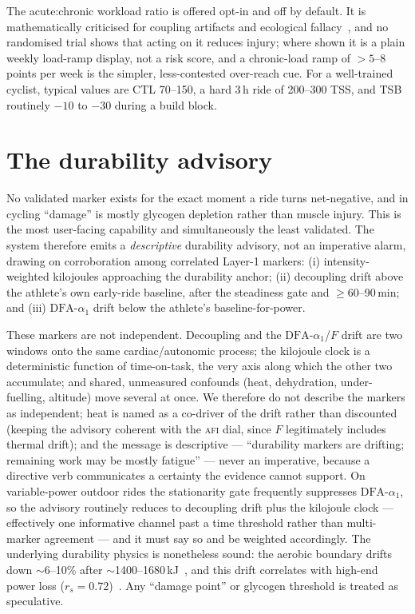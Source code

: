 \documentclass[11pt]{article}
\newcommand{\afi}{\textup{\textsc{afi}}}
\newcommand{\aone}{\ensuremath{\text{DFA-}\alpha_1}}
\newcommand{\Fstate}{\ensuremath{F}}
\begin{document}
The acute:chronic workload ratio is offered opt-in and off by default. It is mathematically criticised for coupling artifacts and ecological fallacy~\cite{lolli,impellizzeri}, and no randomised trial shows that acting on it reduces injury; where shown it is a plain weekly load-ramp display, not a risk score, and a chronic-load ramp of ${>}5$--8 points per week is the simpler, less-contested over-reach cue. For a well-trained cyclist, typical values are CTL 70--150, a hard 3\,h ride of 200--300 TSS, and TSB routinely $-10$ to $-30$ during a build block.

\section{The durability advisory}\label{sec:advisory}

No validated marker exists for the exact moment a ride turns net-negative, and in cycling ``damage'' is mostly glycogen depletion rather than muscle injury. This is the most user-facing capability and simultaneously the least validated. The system therefore emits a \emph{descriptive} durability advisory, not an imperative alarm, drawing on corroboration among correlated Layer-1 markers: (i) intensity-weighted kilojoules approaching the durability anchor; (ii) decoupling drift above the athlete's own early-ride baseline, after the steadiness gate and $\geq 60$--90\,min; and (iii) $\aone$ drift below the athlete's baseline-for-power.

These markers are not independent. Decoupling and the $\aone$/$\Fstate$ drift are two windows onto the same cardiac/autonomic process; the kilojoule clock is a deterministic function of time-on-task, the very axis along which the other two accumulate; and shared, unmeasured confounds (heat, dehydration, under-fuelling, altitude) move several at once. We therefore do not describe the markers as independent; heat is named as a co-driver of the drift rather than discounted (keeping the advisory coherent with the \afi{} dial, since $\Fstate$ legitimately includes thermal drift); and the message is descriptive --- ``durability markers are drifting; remaining work may be mostly fatigue'' --- never an imperative, because a directive verb communicates a certainty the evidence cannot support. On variable-power outdoor rides the stationarity gate frequently suppresses $\aone$, so the advisory routinely reduces to decoupling drift plus the kilojoule clock --- effectively one informative channel past a time threshold rather than multi-marker agreement --- and it must say so and be weighted accordingly. The underlying durability physics is nonetheless sound: the aerobic boundary drifts down $\sim$6--10\% after $\sim$1400--1680\,kJ~\cite{maunder,stevens}, and this drift correlates with high-end power loss ($r_s=0.72$)~\cite{vt15min}. Any ``damage point'' or glycogen threshold is treated as speculative.
\end{document}
